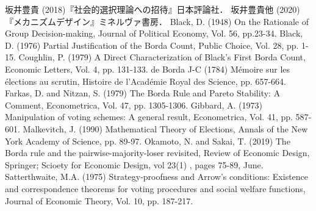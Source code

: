 \documentclass[dvipdfmx]{jsarticle}
\begin{document}
\begin{thebibliography}{9}
  坂井豊貴 (2018)『社会的選択理論への招待』日本評論社．
  坂井豊貴他 (2020)『メカニズムデザイン』ミネルヴァ書房．
  Black, D. (1948) On the Rationale of Group Decision-making, Journal of Political Economy,
  Vol. 56, pp.23-34.
  Black, D. (1976) Partial Justification of the Borda Count, Public Choice,
  Vol. 28, pp. 1-15.
  Coughlin, P. (1979) A Direct Characterization of Black's First Borda Count,
  Economic Letters, Vol. 4, pp. 131-133.
  de Borda J-C (1784) M\'{e}moire sur les \'{e}lections au scrutin, Histoire de l'Acad\'{e}mie
  Royal des Science, pp. 657-664.
  Farkas, D. and Nitzan, S. (1979) The Borda Rule and Pareto Stability: A Comment,
  Econometrica, Vol. 47, pp. 1305-1306.
  Gibbard, A. (1973) Manipulation of voting schemes: A general result, Econometrica, Vol. 41,
  pp. 587-601.
    Malkevitch, J. (1990) Mathematical Theory of Elections, Annals of the New York
    Academy of Science, pp. 89-97.
  Okamoto, N. and Sakai, T. (2019) The Borda rule and the pairwise-majority-loser
  revisited, Review of Economic Design, Springer; Scioety for Economic Design, vol 23(1)
  , pages 75-89, June.
  Satterthwaite, M.A. (1975) Strategy-proofness and Arrow's conditions:
  Existence and correspondence theorems for voting procedures and social
  welfare functions, Journal of Economic Theory, Vol. 10, pp. 187-217.
\end{thebibliography}
\end{document}
